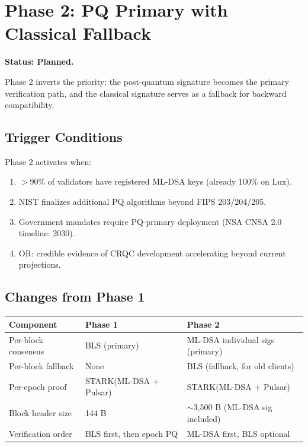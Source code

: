 \section{Phase 2: PQ Primary with Classical Fallback}


\textbf{Status: Planned.}

Phase 2 inverts the priority: the post-quantum signature becomes the primary verification path, and the classical signature serves as a fallback for backward compatibility.

\subsection{Trigger Conditions}

Phase 2 activates when:
\begin{enumerate}[leftmargin=2em]
\item $>$90\% of validators have registered ML-DSA keys (already 100\% on Lux).
\item NIST finalizes additional PQ algorithms beyond FIPS 203/204/205.
\item Government mandates require PQ-primary deployment (NSA CNSA 2.0 timeline: 2030).
\item OR: credible evidence of CRQC development accelerating beyond current projections.
\end{enumerate}

\subsection{Changes from Phase 1}

\begin{center}
\begin{tabular}{lll}
\toprule
\textbf{Component} & \textbf{Phase 1} & \textbf{Phase 2} \\
\midrule
Per-block consensus & BLS (primary) & ML-DSA individual sigs (primary) \\
Per-block fallback & None & BLS (fallback, for old clients) \\
Per-epoch proof & STARK(ML-DSA + Pulsar) & STARK(ML-DSA + Pulsar) \\
Block header size & 144 B & $\sim$3,500 B (ML-DSA sig included) \\
Verification order & BLS first, then epoch PQ & ML-DSA first, BLS optional \\
\bottomrule
\end{tabular}
\end{center}

